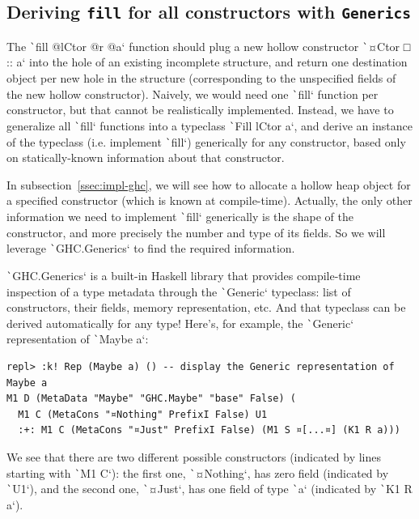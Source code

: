 \documentclass[english]{jflart}
\newlength{\currentparskip}
\newenvironment{unbreakable}
{%
  \setlength{\currentparskip}{\parskip}%
  \setlength{\parskip}{\currentparskip}%
  \par\vspace{0.5\baselineskip}%
  \noindent\begin{minipage}{\textwidth}%
    \setlength{\parskip}{\currentparskip}%
}
{%
  \end{minipage}%
  \par\vspace{0.5\baselineskip}%
}
\begin{document}
\subsection{Deriving \texttt{fill} for all constructors with \texttt{Generics}}\label{ssec:impl-generics}

The \texttt`fill @lCtor @r @a` function should plug a new hollow constructor \texttt`¤Ctor □ :: a` into the hole of an existing incomplete structure, and return one destination object per new hole in the structure (corresponding to the unspecified fields of the new hollow constructor). Naively, we would need one \texttt`fill` function per constructor, but that cannot be realistically implemented. Instead, we have to generalize all \texttt`fill` functions into a typeclass \texttt`Fill lCtor a`, and derive an instance of the typeclass (i.e. implement \texttt`fill`) generically for any constructor, based only on statically-known information about that constructor.

In subsection~\ref{ssec:impl-ghc}, we will see how to allocate a hollow heap object for a specified constructor (which is known at compile-time). Actually, the only other information we need to implement \texttt`fill` generically is the shape of the constructor, and more precisely the number and type of its fields. So we will leverage \texttt`GHC.Generics` to find the required information.

\texttt`GHC.Generics` is a built-in Haskell library that provides compile-time inspection of a type metadata through the \texttt`Generic` typeclass: list of constructors, their fields, memory representation, etc. And that typeclass can be derived automatically for any type! Here's, for example, the \texttt`Generic` representation of \texttt`Maybe a`:

\begin{unbreakable}
{\small
\begin{verbatim}
repl> :k! Rep (Maybe a) () -- display the Generic representation of Maybe a
M1 D (MetaData "Maybe" "GHC.Maybe" "base" False) (
  M1 C (MetaCons "¤Nothing" PrefixI False) U1
  :+: M1 C (MetaCons "¤Just" PrefixI False) (M1 S ¤[...¤] (K1 R a)))
\end{verbatim}
}
\end{unbreakable}

We see that there are two different possible constructors (indicated by lines starting with \texttt`M1 C`): the first one, \texttt`¤Nothing`, has zero field (indicated by \texttt`U1`), and the second one, \texttt`¤Just`, has one field of type \texttt`a` (indicated by \texttt`K1 R a`).
\end{document}

